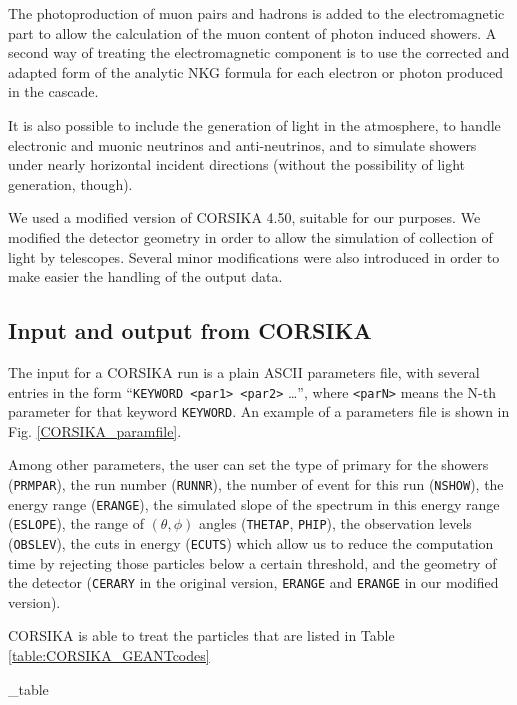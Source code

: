 The photoproduction of muon pairs and hadrons is added to the
electromagnetic part to allow the calculation of the muon content of
photon induced showers. A second way of treating the electromagnetic
component is to use the corrected and adapted form of the analytic NKG
formula for each electron or photon produced in the cascade.

It is also possible to include the generation of \Cherenkov light in
the atmosphere, to handle electronic and muonic neutrinos and
anti-neutrinos, and to simulate showers under nearly horizontal
incident directions (without the possibility of \Cherenkov light
generation, though).

We used a modified version of CORSIKA 4.50, suitable for our purposes.
We modified the detector geometry in order to allow the simulation of
collection of light by \Cherenkov telescopes. Several minor
modifications were also introduced in order to make easier the
handling of the output data.

\subsection{Input and output from CORSIKA}
%
The input for a CORSIKA run is a plain ASCII parameters file, with
several entries in the form ``\texttt{KEYWORD <par1> <par2>} \ldots'',
where \texttt{<parN>} means the N-th parameter for that keyword
\texttt{KEYWORD}. An example of a parameters file is shown in Fig.
\ref{CORSIKA_paramfile}.

\CORSIKAsampleInputfig

Among other parameters, the user can set the type of primary for the
showers (\texttt{PRMPAR}), the run number (\texttt{RUNNR}), the number
of event for this run (\texttt{NSHOW}), the energy range
(\texttt{ERANGE}), the simulated slope of the spectrum in this energy
range (\texttt{ESLOPE}), the range of $(\theta,\phi)$ angles
(\texttt{THETAP}, \texttt{PHIP}), the observation levels
(\texttt{OBSLEV}), the cuts in energy (\texttt{ECUTS}) which allow us
to reduce the computation time by rejecting those particles below a
certain threshold, and the geometry of the detector (\texttt{CERARY}
in the original version, \texttt{ERANGE} and \texttt{ERANGE} in our
modified version).

CORSIKA is able to treat the particles that are listed in Table
\ref{table:CORSIKA_GEANTcodes}

\CORSIKAGeantcodes_table

